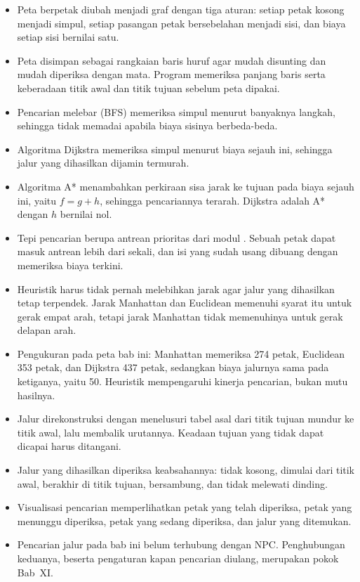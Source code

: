 
\begin{rangkumanbox}
\begin{itemize}
  \item Peta berpetak diubah menjadi graf dengan tiga aturan: setiap petak
        kosong menjadi simpul, setiap pasangan petak bersebelahan menjadi sisi,
        dan biaya setiap sisi bernilai satu.
  \item Peta disimpan sebagai rangkaian baris huruf agar mudah disunting dan
        mudah diperiksa dengan mata. Program memeriksa panjang baris serta
        keberadaan titik awal dan titik tujuan sebelum peta dipakai.
  \item Pencarian melebar (BFS) memeriksa simpul menurut banyaknya langkah,
        sehingga tidak memadai apabila biaya sisinya berbeda-beda.
  \item Algoritma Dijkstra memeriksa simpul menurut biaya sejauh ini, sehingga
        jalur yang dihasilkan dijamin termurah.
  \item Algoritma A* menambahkan perkiraan sisa jarak ke tujuan pada biaya
        sejauh ini, yaitu $f = g + h$, sehingga pencariannya terarah. Dijkstra
        adalah A* dengan $h$ bernilai nol.
  \item Tepi pencarian berupa antrean prioritas dari modul .
        Sebuah petak dapat masuk antrean lebih dari sekali, dan isi yang sudah
        usang dibuang dengan memeriksa biaya terkini.
  \item Heuristik harus tidak pernah melebihkan jarak agar jalur yang
        dihasilkan tetap terpendek. Jarak Manhattan dan Euclidean memenuhi
        syarat itu untuk gerak empat arah, tetapi jarak Manhattan tidak
        memenuhinya untuk gerak delapan arah.
  \item Pengukuran pada peta bab ini: Manhattan memeriksa 274 petak, Euclidean
        353 petak, dan Dijkstra 437 petak, sedangkan biaya jalurnya sama pada
        ketiganya, yaitu 50. Heuristik mempengaruhi kinerja pencarian, bukan
        mutu hasilnya.
  \item Jalur direkonstruksi dengan menelusuri tabel asal dari titik tujuan
        mundur ke titik awal, lalu membalik urutannya. Keadaan tujuan yang tidak
        dapat dicapai harus ditangani.
  \item Jalur yang dihasilkan diperiksa keabsahannya: tidak kosong, dimulai
        dari titik awal, berakhir di titik tujuan, bersambung, dan tidak
        melewati dinding.
  \item Visualisasi pencarian memperlihatkan petak yang telah diperiksa, petak
        yang menunggu diperiksa, petak yang sedang diperiksa, dan jalur yang
        ditemukan.
  \item Pencarian jalur pada bab ini belum terhubung dengan NPC. Penghubungan
        keduanya, beserta pengaturan kapan pencarian diulang, merupakan pokok
        Bab~XI.
\end{itemize}
\end{rangkumanbox}
